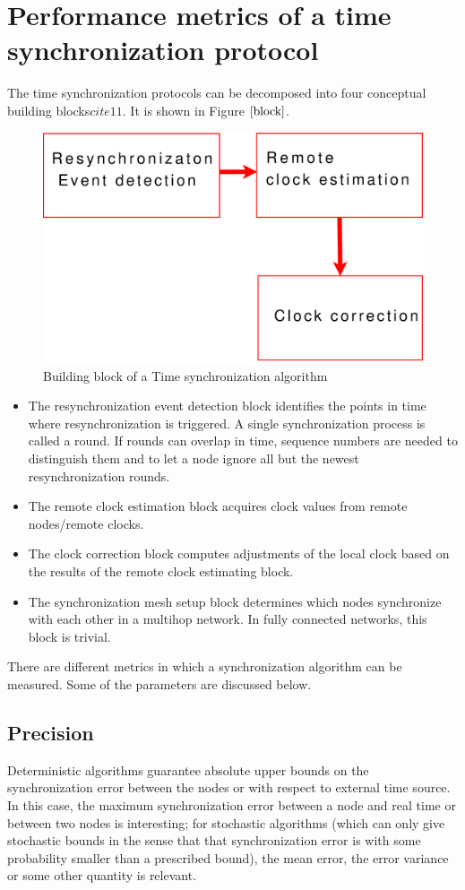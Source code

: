 \documentclass[a4paper,10pt]{report}
\begin{document}
\section{\textbf{Performance metrics of a time synchronization protocol}}
The time synchronization protocols can be decomposed into four conceptual building blocks$cite{11}$. It is shown in Figure
$\ref{block}$.
\begin{figure}
 \centering
\includegraphics[width= 0.6 \textwidth]{buildingblock}
\caption{Building block of a Time synchronization algorithm}
\label{block}
\end{figure}
\begin{itemize}
\item The resynchronization event detection block identifies the points in time where resynchronization is triggered. A single synchronization process is called a round. If rounds can overlap in time, sequence numbers are needed to distinguish them and to let a node ignore all but the newest resynchronization rounds.
\item The remote clock estimation block acquires clock values from remote nodes/remote clocks.
\item The clock correction block computes adjustments of the local clock based on the results of the remote clock estimating block.
\item The synchronization mesh setup block determines which nodes synchronize with each other in a multihop network. In fully connected networks, this block is trivial.
\end{itemize}
There are different metrics in which a synchronization algorithm can be measured. Some of the parameters are discussed below.
\subsection{\textbf{Precision}}
Deterministic algorithms guarantee absolute upper bounds on the synchronization error between the nodes or with
respect to external time source. In this case, the maximum synchronization error between a node and real time or between
two nodes is interesting; for stochastic algorithms (which can only give stochastic bounds in the sense that that synchronization
error is with some probability smaller than a prescribed bound), the mean error, the error variance or some other quantity is relevant.
\end{document}

